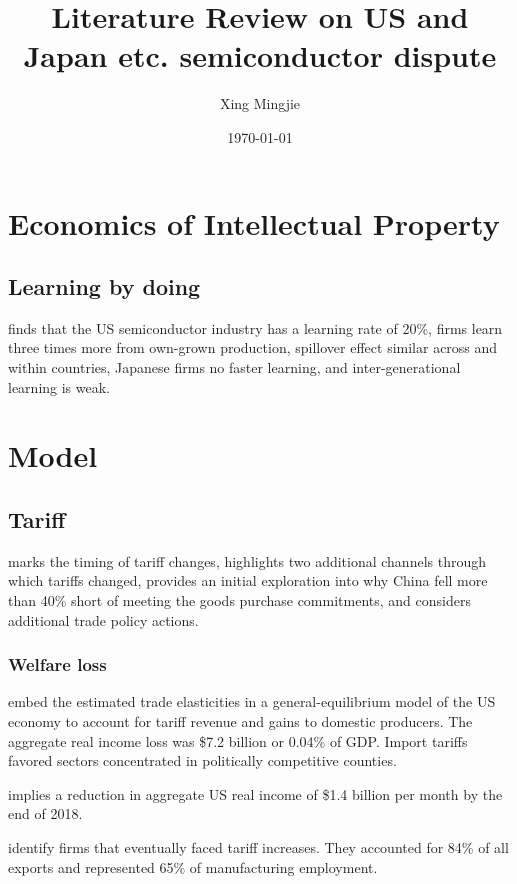 \documentclass[10pt]{article} %
\title{Literature Review on US and Japan etc. semiconductor dispute}
\author{Xing Mingjie}
\date{\today} %
\begin{document}
\maketitle

\tableofcontents

\newpage

\section{Economics of Intellectual Property}
    \subsection{Learning by doing}
    \cite{IrwinKlenow1994} finds that the US semiconductor industry has a learning rate of 20\%, firms learn three times more from own-grown production, spillover effect similar across and within countries, Japanese firms no faster learning, and inter-generational learning is weak.
\section{Model}
    \subsection{Tariff}
        \cite{BOWN2021} marks the timing of tariff changes, highlights two additional channels through which tariffs changed, provides an initial exploration into why China fell more than 40\% short of meeting the goods purchase commitments, and considers additional trade policy actions.

        \subsubsection{Welfare loss}
        \cite{Fajgelbaumetal2019} embed the estimated trade elasticities in a general-equilibrium model of the US economy to account for tariff revenue and gains to domestic producers. The aggregate real income loss was \$7.2 billion or 0.04\% of GDP. Import tariffs favored sectors concentrated in politically competitive counties.

        \cite{AmitiReddingWeinstein2019} implies a reduction in aggregate US real income of \$1.4 billion per month by the end of 2018.

        \cite{HandleyKamalMonarch2020} identify firms that eventually faced tariff increases. They accounted for 84\% of all exports and represented 65\% of manufacturing employment.
\end{document}
